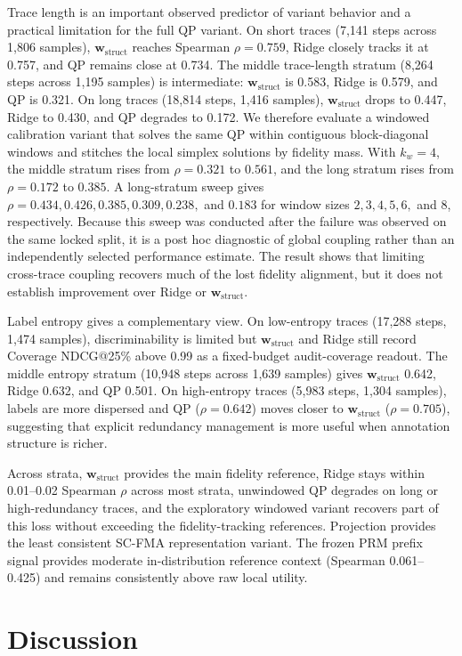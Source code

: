 \documentclass[pdflatex,sn-mathphys-num,iicol]{sn-jnl}
\newcommand{\wstruct}{\ensuremath{\mathbf{w}_{\mathrm{struct}}}}
\begin{document}
Trace length is an important observed predictor of variant behavior and a practical limitation for the full QP variant. On short traces (7,141 steps across 1,806 samples), \wstruct{} reaches Spearman $\rho = 0.759$, Ridge closely tracks it at 0.757, and QP remains close at 0.734. The middle trace-length stratum (8,264 steps across 1,195 samples) is intermediate: \wstruct{} is 0.583, Ridge is 0.579, and QP is 0.321. On long traces (18,814 steps, 1,416 samples), \wstruct{} drops to 0.447, Ridge to 0.430, and QP degrades to 0.172. We therefore evaluate a windowed calibration variant that solves the same QP within contiguous block-diagonal windows and stitches the local simplex solutions by fidelity mass. With $k_w=4$, the middle stratum rises from $\rho=0.321$ to $0.561$, and the long stratum rises from $\rho=0.172$ to $0.385$. A long-stratum sweep gives $\rho=0.434, 0.426, 0.385, 0.309, 0.238,$ and $0.183$ for window sizes $2,3,4,5,6,$ and $8$, respectively. Because this sweep was conducted after the failure was observed on the same locked split, it is a post hoc diagnostic of global coupling rather than an independently selected performance estimate. The result shows that limiting cross-trace coupling recovers much of the lost fidelity alignment, but it does not establish improvement over Ridge or \wstruct{}.

Label entropy gives a complementary view. On low-entropy traces (17,288 steps, 1,474 samples), discriminability is limited but \wstruct{} and Ridge still record Coverage NDCG@25\% above 0.99 as a fixed-budget audit-coverage readout. The middle entropy stratum (10,948 steps across 1,639 samples) gives \wstruct{} 0.642, Ridge 0.632, and QP 0.501. On high-entropy traces (5,983 steps, 1,304 samples), labels are more dispersed and QP ($\rho = 0.642$) moves closer to \wstruct{} ($\rho = 0.705$), suggesting that explicit redundancy management is more useful when annotation structure is richer.

Across strata, \wstruct{} provides the main fidelity reference, Ridge stays within 0.01--0.02 Spearman $\rho$ across most strata, unwindowed QP degrades on long or high-redundancy traces, and the exploratory windowed variant recovers part of this loss without exceeding the fidelity-tracking references. Projection provides the least consistent SC-FMA representation variant. The frozen PRM prefix signal provides moderate in-distribution reference context (Spearman 0.061--0.425) and remains consistently above raw local utility.

\section{Discussion}
\label{sec:discussion}
\end{document}
